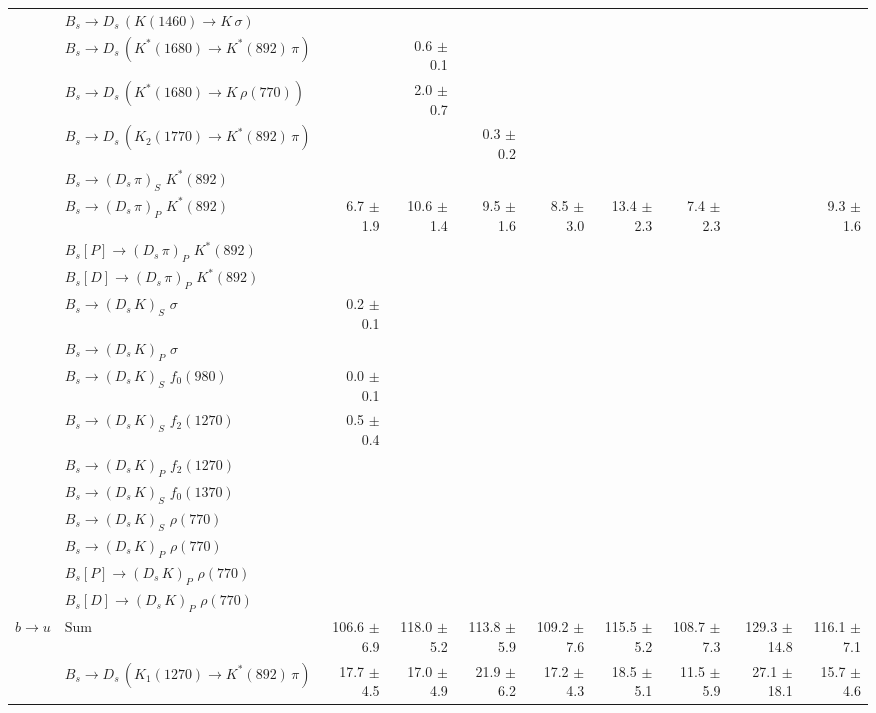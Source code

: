\begin{tabular}{l l  r  r  r  r  r  r  r  r  }
 & $B_s \to D_s \, ( K(1460) \to K \, \sigma )$ &  &  &  &  &  &  &  &  \\ 
 & $B_s \to D_s \, ( K^{*}(1680) \to K^{*}(892) \, \pi )$ &  & 0.6 $\pm$ 0.1 &  &  &  &  &  &  \\ 
 & $B_s \to D_s \, ( K^{*}(1680) \to K \, \rho(770) )$ &  & 2.0 $\pm$ 0.7 &  &  &  &  &  &  \\ 
 & $B_s \to D_s \, ( K_2(1770) \to K^{*}(892) \, \pi )$ &  &  & 0.3 $\pm$ 0.2 &  &  &  &  &  \\ 
 & $B_s \to ( D_s \, \pi)_{S} \, \, K^{*}(892)$ &  &  &  &  &  &  &  &  \\ 
 & $B_s \to ( D_s \, \pi)_{P} \, \, K^{*}(892)$ & 6.7 $\pm$ 1.9 & 10.6 $\pm$ 1.4 & 9.5 $\pm$ 1.6 & 8.5 $\pm$ 3.0 & 13.4 $\pm$ 2.3 & 7.4 $\pm$ 2.3 &  & 9.3 $\pm$ 1.6 \\ 
 & $B_s[P] \to ( D_s \, \pi)_{P} \, \, K^{*}(892)$ &  &  &  &  &  &  &  &  \\ 
 & $B_s[D] \to ( D_s \, \pi)_{P} \, \, K^{*}(892)$ &  &  &  &  &  &  &  &  \\ 
 & $B_s \to ( D_s \, K)_{S} \, \, \sigma$ & 0.2 $\pm$ 0.1 &  &  &  &  &  &  &  \\ 
 & $B_s \to ( D_s \, K)_{P} \, \, \sigma$ &  &  &  &  &  &  &  &  \\ 
 & $B_s \to ( D_s \, K)_{S} \, \, f_0(980)$ & 0.0 $\pm$ 0.1 &  &  &  &  &  &  &  \\ 
 & $B_s \to ( D_s \, K)_{S} \, \, f_2(1270)$ & 0.5 $\pm$ 0.4 &  &  &  &  &  &  &  \\ 
 & $B_s \to ( D_s \, K)_{P} \, \, f_2(1270)$ &  &  &  &  &  &  &  &  \\ 
 & $B_s \to ( D_s \, K)_{S} \, \, f_0(1370)$ &  &  &  &  &  &  &  &  \\ 
 & $B_s \to ( D_s \, K)_{S} \, \, \rho(770)$ &  &  &  &  &  &  &  &  \\ 
 & $B_s \to ( D_s \, K)_{P} \, \, \rho(770)$ &  &  &  &  &  &  &  &  \\ 
 & $B_s[P] \to ( D_s \, K)_{P} \, \, \rho(770)$ &  &  &  &  &  &  &  &  \\ 
 & $B_s[D] \to ( D_s \, K)_{P} \, \, \rho(770)$ &  &  &  &  &  &  &  &  \\ 
\multirow{32}{*}{$b \to u$}  & $\text{Sum}$ & 106.6 $\pm$ 6.9 & 118.0 $\pm$ 5.2 & 113.8 $\pm$ 5.9 & 109.2 $\pm$ 7.6 & 115.5 $\pm$ 5.2 & 108.7 $\pm$ 7.3 & 129.3 $\pm$ 14.8 & 116.1 $\pm$ 7.1 \\ 
\hline
 & $B_s \to D_s \, ( K_1(1270) \to K^{*}(892) \, \pi )$ & 17.7 $\pm$ 4.5 & 17.0 $\pm$ 4.9 & 21.9 $\pm$ 6.2 & 17.2 $\pm$ 4.3 & 18.5 $\pm$ 5.1 & 11.5 $\pm$ 5.9 & 27.1 $\pm$ 18.1 & 15.7 $\pm$ 4.6 \\ 

\end{tabular}

